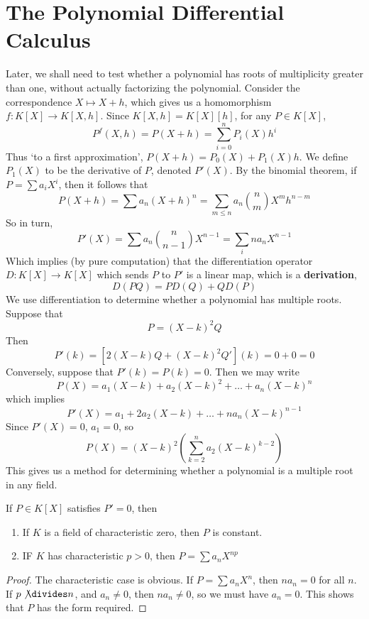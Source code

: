\section{The Polynomial Differential Calculus}

Later, we shall need to test whether a polynomial has roots of multiplicity greater than one, without actually factorizing the polynomial. Consider the correspondence $X \mapsto X + h$, which gives us a homomorphism $f: K[X] \to K[X,h]$. Since $K[X,h] = K[X][h]$, for any $P \in K[X]$,
%
\[ P^f(X,h) = P(X + h) = \sum_{i = 0}^n P_i(X) h^i \]
%
Thus `to a first approximation', $P(X + h) = P_0(X) + P_1(X) h$. We define $P_1(X)$ to be the derivative of $P$, denoted $P'(X)$. By the binomial theorem, if $P = \sum a_i X^i$, then it follows that
%
\[ P(X + h) = \sum a_n (X + h)^n = \sum_{m \leq n} a_n \binom{n}{m} X^m h^{n-m} \]
%
So in turn,
%
\[ P'(X) = \sum a_n \binom{n}{n-1} X^{n-1} = \sum_i n a_n X^{n-1} \]
%
Which implies (by pure computation) that the differentiation operator $D: K[X] \to K[X]$ which sends $P$ to $P'$ is a linear map, which is a {\bf derivation},
%
\[ D(PQ) = PD(Q) + QD(P) \]
%
We use differentiation to determine whether a polynomial has multiple roots. Suppose that
%
\[ P = (X - k)^2 Q \]
%
Then
%
\[ P'(k) = [2 (X - k) Q + (X - k)^2 Q'](k) = 0 + 0 = 0 \]
%
Conversely, suppose that $P'(k) = P(k) = 0$. Then we may write
%
\[ P(X) = a_1 (X - k) + a_2 (X - k)^2 + \dots + a_n (X - k)^n \]
%
which implies
%
\[ P'(X) = a_1 + 2 a_2 (X - k) + \dots + n a_n (X - k)^{n-1} \]
%
Since $P'(X) = 0$, $a_1 = 0$, so
%
\[ P(X) = (X - k)^2 \left( \sum_{k = 2}^n a_2 (X - k)^{k-2} \right) \]
%
This gives us a method for determining whether a polynomial is a multiple root in any field.

\begin{theorem}
    If $P \in K[X]$ satisfies $P' = 0$, then
    \begin{enumerate}
        \item If $K$ is a field of characteristic zero, then $P$ is constant.
        \item IF $K$ has characteristic $p > 0$, then $P = \sum a_n X^{np}$
    \end{enumerate}
\end{theorem}
\begin{proof}
    The characteristic case is obvious. If $P = \sum a_n X^n$, then $n a_n = 0$ for all $n$. If $p \not \divides n$, and $a_n \neq 0$, then $n a_n \neq 0$, so we must have $a_n = 0$. This shows that $P$ has the form required.
\end{proof}






